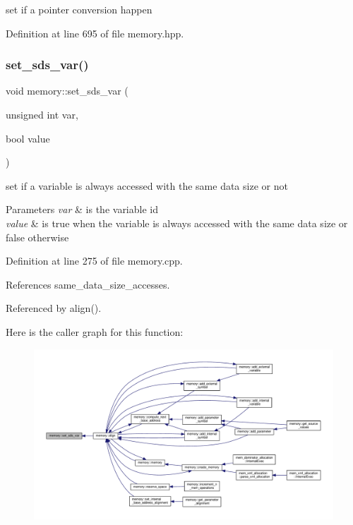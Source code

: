 set if a pointer conversion happen 



Definition at line 695 of file memory.\+hpp.

\mbox{\label{classmemory_a097988cba137c2de02ce55b9a62bf8f7}} 
\subsubsection{\texorpdfstring{set\+\_\+sds\+\_\+var()}{set\_sds\_var()}}
{\footnotesize\ttfamily void memory\+::set\+\_\+sds\+\_\+var (\begin{DoxyParamCaption}\item[{unsigned int}]{var,  }\item[{bool}]{value }\end{DoxyParamCaption})}



set if a variable is always accessed with the same data size or not 


\begin{DoxyParams}{Parameters}
{\em var} & is the variable id \\
\hline
{\em value} & is true when the variable is always accessed with the same data size or false otherwise \\
\hline
\end{DoxyParams}


Definition at line 275 of file memory.\+cpp.



References same\+\_\+data\+\_\+size\+\_\+accesses.



Referenced by align().

Here is the caller graph for this function\+:
\nopagebreak
\begin{figure}[H]
\begin{center}
\leavevmode
\includegraphics[width=350pt]{d8/d99/classmemory_a097988cba137c2de02ce55b9a62bf8f7_icgraph}
\end{center}
\end{figure}
\mbox{\label{classmemory_a7900eedc2a6002a1519927f648064dd8}} 

